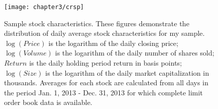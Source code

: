 \clearpage

\begin{figure}[p]
	\small
	\linespread{1}
	\centering
	\texttt{[image: chapter3/crsp]}
	\captionsetup{skip=-20pt, position=below, font=footnotesize, justification=justified, width=\linewidth}
	\caption[Sample stock characteristics]{Sample stock characteristics. These figures demonstrate the distribution of daily average stock characteristics for my sample. $\log(Price)$ is the logarithm of the daily closing price; $\log(Volume)$ is the logarithm of the daily number of shares sold; $Return$ is the daily holding period return in basis points; $\log(Size)$ is the logarithm of the daily market capitalization in thousands. Averages for each stock  are calculated from all days in the period Jan. 1, 2013 - Dec. 31, 2013 for which complete limit order book data is available.}
	\label{fig:crsp}
\end{figure}

